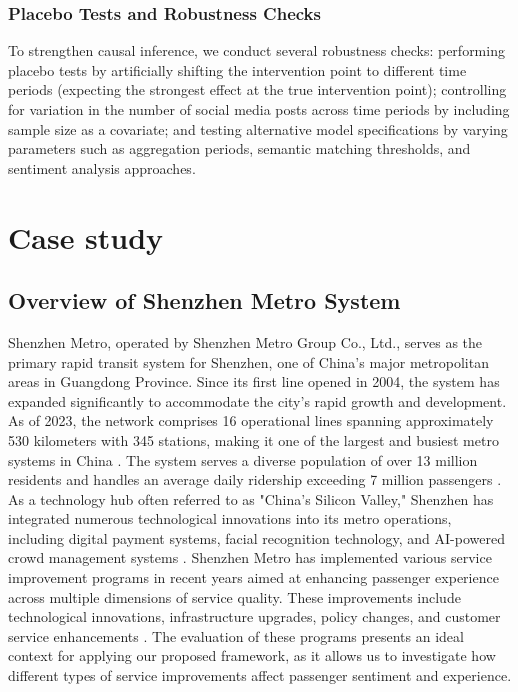\documentclass[a4paper,fleqn,12pt]{cas-sc}
\begin{document}
\subsubsection{Placebo Tests and Robustness Checks}

To strengthen causal inference, we conduct several robustness checks: performing placebo tests by artificially shifting the intervention point to different time periods (expecting the strongest effect at the true intervention point); controlling for variation in the number of social media posts across time periods by including sample size as a covariate; and testing alternative model specifications by varying parameters such as aggregation periods, semantic matching thresholds, and sentiment analysis approaches.


\section{Case study}\label{sec:CaseStudy}

\subsection{Overview of Shenzhen Metro System}

Shenzhen Metro, operated by Shenzhen Metro Group Co., Ltd., serves as the primary rapid transit system for Shenzhen, one of China's major metropolitan areas in Guangdong Province. Since its first line opened in 2004, the system has expanded significantly to accommodate the city's rapid growth and development. As of 2023, the network comprises 16 operational lines spanning approximately 530 kilometers with 345 stations, making it one of the largest and busiest metro systems in China \citep{chen2018demand}. The system serves a diverse population of over 13 million residents and handles an average daily ridership exceeding 7 million passengers \citep{li2022comparative}. As a technology hub often referred to as "China's Silicon Valley," Shenzhen has integrated numerous technological innovations into its metro operations, including digital payment systems, facial recognition technology, and AI-powered crowd management systems \citep{guo2019smart}. Shenzhen Metro has implemented various service improvement programs in recent years aimed at enhancing passenger experience across multiple dimensions of service quality. These improvements include technological innovations, infrastructure upgrades, policy changes, and customer service enhancements \citep{deng2021quality}. The evaluation of these programs presents an ideal context for applying our proposed framework, as it allows us to investigate how different types of service improvements affect passenger sentiment and experience.
\end{document}
